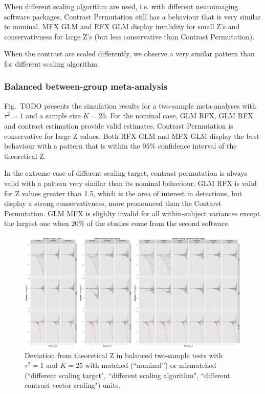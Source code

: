 \documentclass[preprint]{elsarticle}
\newcommand{\nStudies}{K}
\newcommand{\varBetween}{\tau^2}
\begin{document}
When different scaling algorithm are used, i.e. with different neuroimaging software packages, Contrast Permutation still has a behaviour that is very similar to nominal. MFX GLM and RFX GLM display invalidity for small Z's and conservativness for large Z's (but less conservative than Contrast Permutation). 

When the contrast are scaled differently, we observe a very similar pattern than for different scaling algorithm.

\subsubsection{Balanced between-group meta-analysis}

Fig.~TODO presents the simulation results for a two-sample meta-analyses with $\varBetween=1$ and a sample size $\nStudies = 25$. For the nominal case, GLM RFX, GLM RFX and contrast estimation provide valid estimates. Contrast Permutation is conservative for large Z values. Both RFX GLM and MFX GLM display the best behaviour with a pattern that is within the 95\% confidence interval of the theoretical Z.

In the extreme case of different scaling target, contrast permutation is always valid with a pattern very similar than its nominal behaviour. GLM RFX is valid for Z values greater than 1.5, which is the area of interest in detections, but display a strong conservativness, more pronounced than the Contarst Permutation. GLM MFX is slighlty invalid for all within-subject variances except the largest one when 20\% of the studies come from the second software.

\begin{figure}[t]
	\centering
 	\includegraphics[width=0.99\linewidth]{./figures/test2_btw1.png}
	\caption{Deviation from theoretical Z in balanced two-sample tests with $\varBetween=1$ and $\nStudies = 25$ with matched (``nominal'') or mismatched (``different scaling target", ``different scaling algorithm", ``different contrast vector scaling") units.}
	\label{test2_btw1}
\end{figure}
\end{document}
